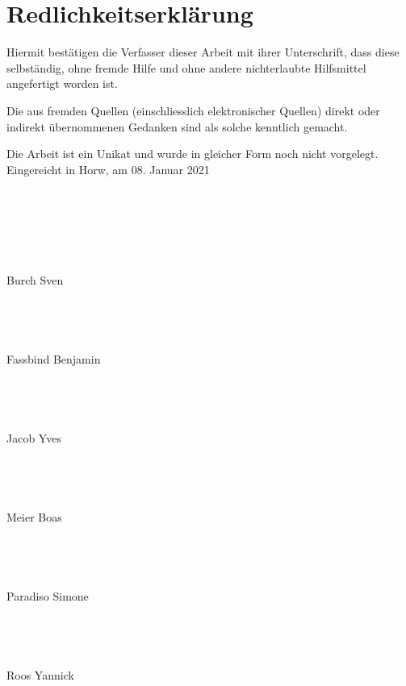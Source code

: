 \newpage
\section*{Redlichkeitserklärung}
\thispagestyle{empty}

 
Hiermit bestätigen die Verfasser dieser Arbeit mit ihrer Unterschrift, dass diese selbständig, ohne fremde Hilfe und ohne andere nichterlaubte Hilfsmittel angefertigt worden ist. 

 

Die aus fremden Quellen (einschliesslich elektronischer Quellen) direkt oder indirekt übernommenen Gedanken sind als solche kenntlich gemacht. 

 

Die Arbeit ist ein Unikat und wurde in gleicher Form noch nicht vorgelegt.\\

 

Eingereicht in Horw, am 08. Januar 2021
\\
\\
\\
\\
\\
\\
\\
Burch Sven
\\
\\
\\
\\
\\
Fassbind Benjamin
\\
\\
\\
\\
\\
Jacob Yves
\\
\\
\\
\\
\\
Meier Boas
\\
\\
\\
\\
\\
Paradiso Simone
\\
\\
\\
\\
\\
Roos Yannick